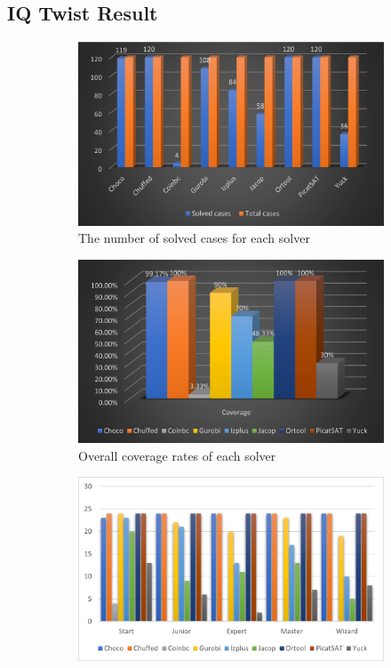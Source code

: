 \subsection{IQ Twist Result}
\label{sec:IQtwistresult}
\begin{figure}[htbp]
    \centering
    \begin{subfigure}[b]{0.48\textwidth}
    \centering
    \includegraphics[width=\textwidth]{figs/solvedcases.png}
    \caption{The number of solved cases for each solver}
    \label{eva1}
    \end{subfigure}
     \begin{subfigure}[b]{0.48\textwidth}
     \centering
    \includegraphics[width=\textwidth]{figs/coverage.png}
    \caption{Overall coverage rates of each solver}
    \label{eva2}
    \end{subfigure}
     \begin{subfigure}[b]{0.48\textwidth}
    \includegraphics[width=\textwidth]{figs/separated number.png}

\end{subfigure}
\end{figure}
